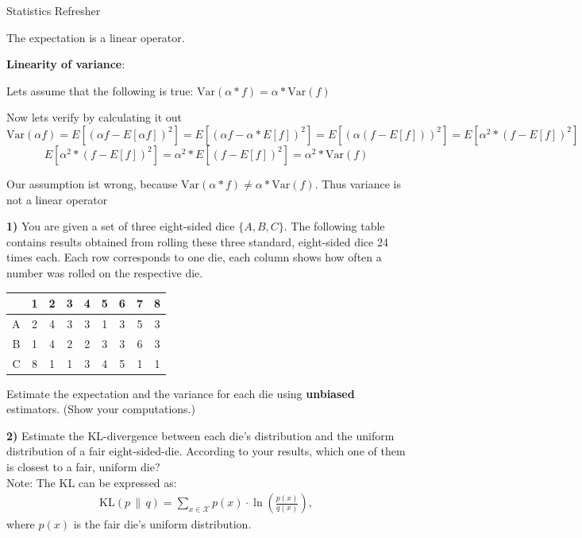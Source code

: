 \documentclass[
	english,
        solution=true
	]{tudaexercise}
\begin{document}
\begin{task}[points=15]{Statistics Refresher}
\begin{subtask}[points=4,title=Expectation and Variance]
\begin{solution}
The expectation is a linear operator.

\textbf{Linearity of variance}:

Lets assume that the following is true: $\text{Var}(\alpha * f)=\alpha * \text{Var}(f)$

Now lets verify by calculating it out
\[\text{Var}(\alpha f)=E[(\alpha f - E[\alpha f])^2]= E[(\alpha f - \alpha * E[f])^2]=E[(\alpha(f - E[f]))^2]=E[\alpha^2 *(f-E[f])^2]
\]
\[E[\alpha^2 *(f-E[f])^2]=\alpha^2 * E[(f-E[f])^2]=\alpha^2*\text{Var}(f)\]

Our assumption ist wrong, because $\text{Var}(\alpha*f)\ne \alpha * \text{Var}(f)$. Thus variance is not a linear operator
\end{solution}
\end{subtask}


\begin{subtask}[points=4,title=Unbiased Estimators and KL-Divergence]


\textbf{1)} You are given a set of three eight-sided dice $\{A,B,C\}$.
The following table contains results obtained from rolling these three
standard, eight-sided dice 24 times each. Each row corresponds to one die,
each column shows how often a number was rolled on the respective die.

    \begin{center}
    \begin{tabular}{r|cccccccc}
     & 1 & 2 & 3 & 4 & 5 & 6 & 7 & 8 \\ 
        \hline
        \hline
    A & 2 & 4 & 3 & 3 & 1 & 3 & 5 & 3 \\ \hline
    B & 1 & 4 & 2 & 2 & 3 & 3 & 6 & 3 \\ \hline
    C & 8 & 1 & 1 & 3 & 4 & 5 & 1 & 1 
    \end{tabular}
    \end{center}

Estimate the expectation and the variance for each die using \textbf{unbiased} estimators. (Show your computations.)

\textbf{2)} Estimate the KL-divergence between each die's distribution and
 the uniform distribution of a fair eight-sided-die. According to your results, which one of them is
closest to a fair, uniform die?\\
Note: The KL can be expressed as:
\begin{align*}
    \mathrm{KL}(p \,\|\, q) = \sum_{x \in \mathcal{X}} p(x) \cdot \ln \left( \frac{p(x)}{q(x)} \right),
\end{align*}
where $p(x)$ is the fair die’s uniform distribution.


\end{subtask}
\end{task}
\end{document}
